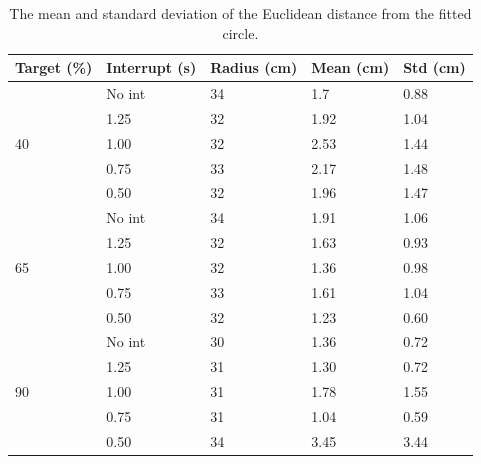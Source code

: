 \begin{table}[t]
	\centering
	\caption{The mean and standard deviation of the Euclidean distance from the fitted circle.}
	\label{tab:circular_results}
	\begin{tabular}{|l|l||l|l|l|}
		\hline
		Target (\%) & Interrupt (s) & Radius (cm) & Mean (cm) & Std (cm)\\
		\hline \hline
		\multirow{5}{*}{40} & No int & 34 & 1.7 & 0.88 \\
		& 1.25 & 32 & 1.92 & 1.04 \\
		& 1.00 & 32 & 2.53 & 1.44 \\
		& 0.75 & 33 & 2.17 & 1.48 \\
		& 0.50 & 32 & 1.96 & 1.47 \\
		\hline
		\multirow{5}{*}{65} & No int & 34 & 1.91 & 1.06 \\
		& 1.25 & 32 & 1.63 & 0.93 \\
		& 1.00 & 32 & 1.36 & 0.98 \\
		& 0.75 & 33 & 1.61 & 1.04 \\
		& 0.50 & 32 & 1.23 & 0.60 \\
		\hline
		\multirow{5}{*}{90} & No int & 30 & 1.36 & 0.72 \\
		& 1.25 & 31 & 1.30 & 0.72 \\
		& 1.00 & 31 & 1.78 & 1.55 \\
		& 0.75 & 31 & 1.04 & 0.59 \\
		& 0.50 & 34 & 3.45 & 3.44 \\
		\hline
	\end{tabular}
\end{table}


